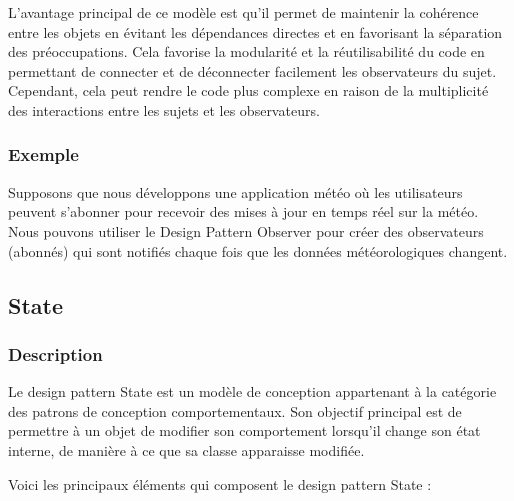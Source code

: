 \documentclass[french]{article}
\begin{document}
L'avantage principal de ce modèle est qu'il permet de maintenir la cohérence entre les objets en évitant les dépendances directes et en favorisant la séparation des préoccupations. Cela favorise la modularité et la réutilisabilité du code en permettant de connecter et de déconnecter facilement les observateurs du sujet. Cependant, cela peut rendre le code plus complexe en raison de la multiplicité des interactions entre les sujets et les observateurs.


\subsubsection{Exemple}

Supposons que nous développons une application météo où les utilisateurs peuvent s'abonner pour recevoir des mises à jour en temps réel sur la météo. Nous pouvons utiliser le Design Pattern Observer pour créer des observateurs (abonnés) qui sont notifiés chaque fois que les données météorologiques changent.




\newpage

\subsection{State}

\subsubsection{Description}

Le design pattern State est un modèle de conception appartenant à la catégorie des patrons de conception comportementaux. Son objectif principal est de permettre à un objet de modifier son comportement lorsqu'il change son état interne, de manière à ce que sa classe apparaisse modifiée.

Voici les principaux éléments qui composent le design pattern State :
\end{document}
